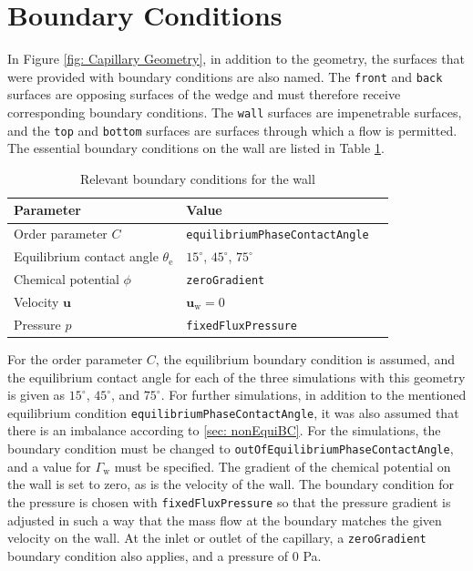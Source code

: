 \section{Boundary Conditions}
In Figure \ref{fig: Capillary Geometry}, in addition to the geometry, the surfaces that were provided with boundary conditions are also named. The \texttt{front} and \texttt{back} surfaces are opposing surfaces of the wedge and must therefore receive corresponding boundary conditions. The \texttt{wall} surfaces are impenetrable surfaces, and the \texttt{top} and \texttt{bottom} surfaces are surfaces through which a flow is permitted.
The essential boundary conditions on the wall are listed in Table \ref{tab: BoundaryConditions_wall}.

\begin{table}[h]
    \centering
    \caption{Relevant boundary conditions for the wall}
    \label{tab: BoundaryConditions_wall}
    \begin{tabular}{lll}
        Parameter & Value \\ \hline
        Order parameter $C$ & \texttt{equilibriumPhaseContactAngle} \\
        Equilibrium contact angle $\theta_{\mathrm{e}}$ & $15^{\circ}$, $45^{\circ}$, $75^{\circ}$ \\
        Chemical potential $\phi$ & \texttt{zeroGradient} \\
        Velocity $\mathbf{u}$ & $\mathbf{u_{\mathrm{w}}} = 0$ \\
        Pressure $p$ & \texttt{fixedFluxPressure} \\
    \end{tabular}
\end{table}
For the order parameter $C$, the equilibrium boundary condition is assumed, and the equilibrium contact angle for each of the three simulations with this geometry is given as $15^{\circ}$, $45^{\circ}$, and $75^{\circ}$. For further simulations, in addition to the mentioned equilibrium condition \texttt{equilibriumPhaseContactAngle}, it was also assumed that there is an imbalance according to \ref{sec: nonEquiBC}. For the simulations, the boundary condition must be changed to \texttt{outOfEquilibriumPhaseContactAngle}, and a value for $\Gamma_{\mathrm{w}}$ must be specified.
The gradient of the chemical potential on the wall is set to zero, as is the velocity of the wall. The boundary condition for the pressure is chosen with \texttt{fixedFluxPressure} so that the pressure gradient is adjusted in such a way that the mass flow at the boundary matches the given velocity on the wall.
At the inlet or outlet of the capillary, a \texttt{zeroGradient} boundary condition also applies, and a pressure of $0$ Pa.

